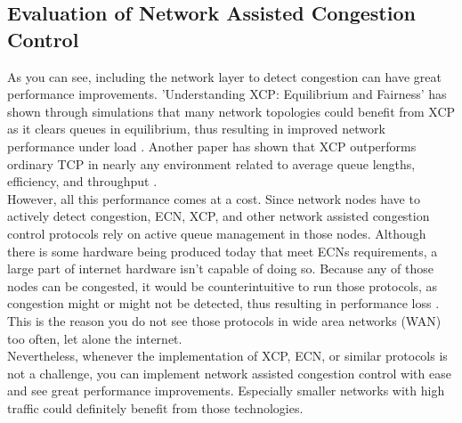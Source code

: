 \documentclass[a4paper,conference]{IEEEtran}
\begin{document}
\subsection{Evaluation of Network Assisted Congestion Control}
As you can see, including the network layer to detect congestion can have great performance improvements. 'Understanding XCP: Equilibrium and Fairness' has shown through simulations that many network topologies could benefit from XCP as it clears queues in equilibrium, thus resulting in improved network performance under load \cite{1498331}. Another paper has shown that XCP outperforms ordinary TCP in nearly any environment related to average queue lengths, efficiency, and throughput \cite{katabi2002congestion}.
\\However, all this performance comes at a cost. Since network nodes have to actively detect congestion, ECN, XCP, and other network assisted congestion control protocols rely on active queue management in those nodes. Although there is some hardware being produced today that meet ECNs requirements, a large part of internet hardware isn't capable of doing so. Because any of those nodes can be congested, it would be counterintuitive to run those protocols, as congestion might or might not be detected, thus resulting in performance loss \cite{katabi2002congestion}. This is the reason you do not see those protocols in wide area networks (WAN) too often, let alone the internet.
\\Nevertheless, whenever the implementation of XCP, ECN, or similar protocols is not a challenge, you can implement network assisted congestion control with ease and see great performance improvements. Especially smaller networks with high traffic could definitely benefit from those technologies.
\end{document}
